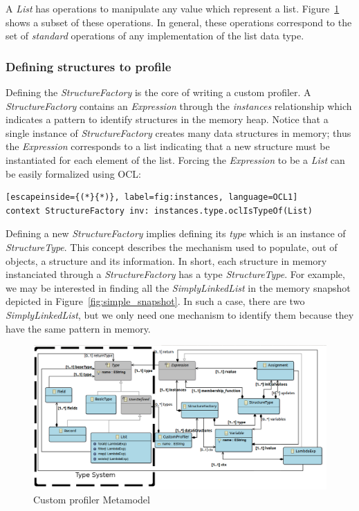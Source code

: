 A \textit{List} has operations to manipulate any value which represent a list.
Figure~\ref{fig:as} shows a subset of these operations.
In general, these operations correspond to the set of \textit{standard} operations of any implementation of the list data type.

\subsubsection{Defining structures to profile}
Defining the \textit{StructureFactory} is the core of writing a custom profiler.
A \textit{StructureFactory} contains an \textit{Expression} through the \textit{instances} relationship which indicates a pattern to identify structures in the memory heap.
Notice that a single instance of \textit{StructureFactory} creates many data structures in memory; thus the \textit{Expression} corresponds to a list indicating that a new structure must be instantiated for each element of the list.
Forcing the \textit{Expression} to be a \textit{List} can be easily formalized using OCL:

\begin{lstlisting}[escapeinside={(*}{*)}, label=fig:instances, language=OCL1]
context StructureFactory inv: instances.type.oclIsTypeOf(List)
\end{lstlisting}

Defining a new \textit{StructureFactory} implies defining its \textit{type} which is an instance of \textit{StructureType}.
This concept describes the mechanism used to populate, out of objects, a structure and its information.
In short, each structure in memory instanciated through a \textit{StructureFactory} has a type \textit{StructureType}.
For example, we may be interested in finding all the \textit{SimplyLinkedList} in the memory snapshot depicted in Figure~\ref{fig:simple_snapshot}.
In such a case, there are two \textit{SimplyLinkedList}, but we only need one mechanism to identify them because they have the same pattern in memory. 

\begin{figure}
\centering
\includegraphics[width=0.87\linewidth]{chapter6/fig/AS}
\caption{Custom profiler Metamodel}
\label{fig:as}
\end{figure}


